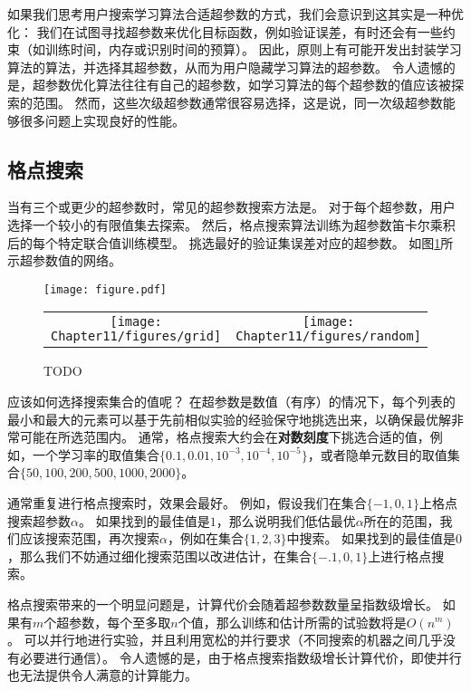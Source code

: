 如果我们思考用户搜索学习算法合适超参数的方式，我们会意识到这其实是一种优化：
我们在试图寻找超参数来优化目标函数，例如验证误差，有时还会有一些约束（如训练时间，内存或识别时间的预算）。
因此，原则上有可能开发出封装学习算法的算法，并选择其超参数，从而为用户隐藏学习算法的超参数。
令人遗憾的是，超参数优化算法往往有自己的超参数，如学习算法的每个超参数的值应该被探索的范围。
然而，这些次级超参数通常很容易选择，这是说，同一次级超参数能够很多问题上实现良好的性能。

\subsection{格点搜索}
\label{sec:grid_search}
当有三个或更少的超参数时，常见的超参数搜索方法是。
对于每个超参数，用户选择一个较小的有限值集去探索。
然后，格点搜索算法训练为超参数笛卡尔乘积后的每个特定联合值训练模型。
挑选最好的验证集误差对应的超参数。
如图\ref{fig:chap11_grid_vs_random}所示超参数值的网络。


\begin{figure}[!htb]
\ifOpenSource
\centerline{\texttt{[image: figure.pdf]}}
\else
\begin{tabular}{cc}
\texttt{[image: Chapter11/figures/grid]} &
\texttt{[image: Chapter11/figures/random]}
\end{tabular}
\fi
\caption{TODO}
\label{fig:chap11_grid_vs_random}
\end{figure}

应该如何选择搜索集合的值呢？
在超参数是数值（有序）的情况下，每个列表的最小和最大的元素可以基于先前相似实验的经验保守地挑选出来，以确保最优解非常可能在所选范围内。
通常，格点搜索大约会在\textbf{对数刻度}下挑选合适的值，例如，一个学习率的取值集合$\{0.1,0.01,10^{-3},10^{-4},10^{-5}\}$，或者隐单元数目的取值集合$\{50,100,200,500,1000,2000\}$。

通常重复进行格点搜索时，效果会最好。
例如，假设我们在集合$\{-1,0,1\}$上格点搜索超参数$\alpha$。
如果找到的最佳值是$1$，那么说明我们低估最优$\alpha$所在的范围，我们应该搜索范围，再次搜索$\alpha$，例如在集合$\{1,2,3\}$中搜索。
如果找到的最佳值是$0$，那么我们不妨通过细化搜索范围以改进估计，在集合$\{-.1,0,1\}$上进行格点搜索。


格点搜索带来的一个明显问题是，计算代价会随着超参数数量呈指数级增长。
如果有$m$个超参数，每个至多取$n$个值，那么训练和估计所需的试验数将是$O(n^m)$。
可以并行地进行实验，并且利用宽松的并行要求（不同搜索的机器之间几乎没有必要进行通信）。
令人遗憾的是，由于格点搜索指数级增长计算代价，即使并行也无法提供令人满意的计算能力。



